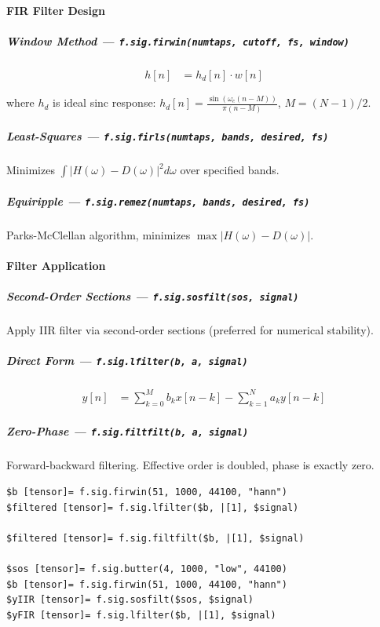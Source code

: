 \paragraph{FIR Filter Design}

\subparagraph{Window Method --- \texttt{f.sig.firwin(numtaps, cutoff, fs, window)}}

\begin{align}
h[n] &= h_d[n] \cdot w[n] \label{eq:sig-firwin}
\end{align}

where $h_d$ is ideal sinc response: $h_d[n] = \frac{\sin(\omega_c (n - M))}{\pi (n - M)}$, $M = (N-1)/2$.

\subparagraph{Least-Squares --- \texttt{f.sig.firls(numtaps, bands, desired, fs)}}
Minimizes $\int |H(\omega) - D(\omega)|^2 d\omega$ over specified bands.

\subparagraph{Equiripple --- \texttt{f.sig.remez(numtaps, bands, desired, fs)}}
Parks-McClellan algorithm, minimizes $\max |H(\omega) - D(\omega)|$.

\paragraph{Filter Application}

\subparagraph{Second-Order Sections --- \texttt{f.sig.sosfilt(sos, signal)}}
Apply IIR filter via second-order sections (preferred for numerical stability).

\subparagraph{Direct Form --- \texttt{f.sig.lfilter(b, a, signal)}}

\begin{align}
y[n] &= \sum_{k=0}^{M} b_k x[n-k] - \sum_{k=1}^{N} a_k y[n-k] \label{eq:sig-lfilter}
\end{align}

\subparagraph{Zero-Phase --- \texttt{f.sig.filtfilt(b, a, signal)}}
Forward-backward filtering. Effective order is doubled, phase is exactly zero.

\begin{verbatim}
$b [tensor]= f.sig.firwin(51, 1000, 44100, "hann")
$filtered [tensor]= f.sig.lfilter($b, |[1], $signal)

$filtered [tensor]= f.sig.filtfilt($b, |[1], $signal)

$sos [tensor]= f.sig.butter(4, 1000, "low", 44100)
$b [tensor]= f.sig.firwin(51, 1000, 44100, "hann")
$yIIR [tensor]= f.sig.sosfilt($sos, $signal)
$yFIR [tensor]= f.sig.lfilter($b, |[1], $signal)
\end{verbatim}


